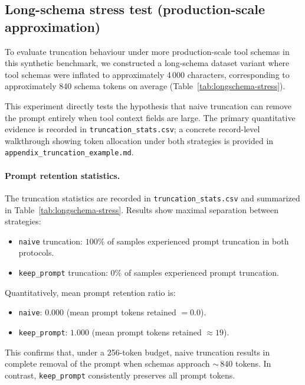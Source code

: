 \subsection{Long-schema stress test (production-scale approximation)}
\label{subsec:longschema_stress_test}

To evaluate truncation behaviour under more production-scale tool schemas in this synthetic benchmark, we constructed a long-schema dataset variant where tool schemas were inflated to approximately 4\,000 characters, corresponding to approximately 840 schema tokens on average (Table~\ref{tab:longschema-stress}).

This experiment directly tests the hypothesis that naive truncation can remove the prompt entirely when tool context fields are large. The primary quantitative evidence is recorded in \texttt{truncation\_stats.csv}; a concrete record-level walkthrough showing token allocation under both strategies is provided in \texttt{appendix\_truncation\_example.md}.

\paragraph{Prompt retention statistics.}
The truncation statistics are recorded in \texttt{truncation\_stats.csv} and summarized in Table~\ref{tab:longschema-stress}. Results show maximal separation between strategies:

\begin{itemize}
    \item \texttt{naive} truncation: $100\%$ of samples experienced prompt truncation in both protocols.
    \item \texttt{keep\_prompt} truncation: $0\%$ of samples experienced prompt truncation.
\end{itemize}

Quantitatively, mean prompt retention ratio is:

\begin{itemize}
    \item \texttt{naive}: $0.000$ (mean prompt tokens retained $= 0.0$).
    \item \texttt{keep\_prompt}: $1.000$ (mean prompt tokens retained $\approx 19$).
\end{itemize}

This confirms that, under a 256-token budget, naive truncation results in complete removal of the prompt when schemas approach ${\sim}\,840$ tokens. In contrast, \texttt{keep\_prompt} consistently preserves all prompt tokens.


